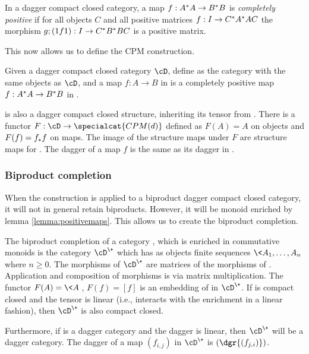 \begin{definition}\label{def:completelypositive}
  In a dagger compact closed category, a map $f:A^{*}\*A \to B^{*}\* B$ is \emph{completely positive}
  if for all objects $C$ and all positive matrices $f: I \to C^{*} \* A^{*} \* A \* C$ the morphism
  $g ; (1\*f\*1):I \to C^{*} \* B^{*}\* B \* C$ is a positive matrix.
\end{definition}

This now allows us to define the CPM construction.

\begin{definition}\label{def:cpmconstruction}
  Given a dagger compact closed category $\cD$, define  as the category with the
  same objects as $\cD$, and a map $f:A\to B$ in  is a completely positive map
  $f:A^{*}\*A \to B^{*}\* B$ in \cD.
\end{definition}

 is also a dagger compact closed structure, inheriting its tensor from \cD.
There is a functor $F:\cD \to \specialcat{CPM(d)}$ defined as $F(A) = A$ on objects and $F(f)=
f_{*}\*f$ on maps. The image of the structure maps under $F$ are structure maps for
. The dagger of a map $f$ is the same as its dagger in \cD.

\subsubsection{Biproduct completion}\label{sec:biproduct}
When the  construction is applied to a biproduct dagger compact closed category, it
will not in general retain biproducts. However, it will be monoid enriched by lemma
\ref{lemma:positivemaps}. This allows us to create the biproduct completion.

The biproduct completion of a category \cD, which is enriched in commutative monoids is the
category $\cD^{\+}$ which has as objects finite sequences $\<A_{1},\ldots,A_{n}\>$ where $n\ge 0$.
The morphisms of $\cD^{\+}$ are matrices of the morphisms of \cD. Application and composition of
morphisms is via matrix multiplication. The functor $F(A) = \<A\>$, $F(f)=[f]$ is an embedding of
\cD{} in $\cD^{\+}$. If \cD{} is compact closed and the tensor is linear (i.e., interacts with the
enrichment in a linear fashion), then $\cD^{\+}$ is also compact closed.

Furthermore, if \cD{} is a dagger category and the dagger is linear, then $\cD^{\+}$ will be a
dagger category. The dagger of a map $(f_{i,j})$ in $\cD^{\+}$ is $(\dgr{(f_{j,i})})$.

